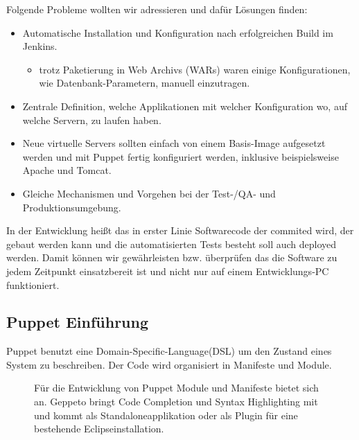 \documentclass[12pt,a4paper,ngerman]{article}
\begin{document}
Folgende Probleme wollten wir adressieren und dafür Lösungen finden:
\begin{itemize}
\item Automatische Installation und Konfiguration nach erfolgreichen Build im Jenkins.
\begin{itemize}
\item trotz Paketierung in Web Archivs (WARs) waren einige Konfigurationen, wie Datenbank-Parametern, manuell einzutragen.
\end{itemize}
\item Zentrale Definition, welche Applikationen mit welcher Konfiguration wo, auf welche Servern, zu laufen haben.
\item Neue virtuelle Servers sollten einfach von einem Basis-Image aufgesetzt werden und mit Puppet fertig konfiguriert werden, inklusive beispielsweise Apache und Tomcat.
\item Gleiche Mechanismen und Vorgehen bei der Test-/QA- und Produktionsumgebung.
\end{itemize}

In der Entwicklung heißt das in erster Linie Softwarecode der commited wird, der gebaut werden kann und die automatisierten Tests besteht soll auch deployed werden. Damit können wir gewährleisten bzw. überprüfen das die Software zu jedem Zeitpunkt einsatzbereit ist und nicht nur auf einem Entwicklungs-PC funktioniert.

\subsection{Puppet Einführung}

Puppet benutzt eine Domain-Specific-Language(DSL) um den Zustand eines System zu beschreiben. Der Code wird organisiert in Manifeste und Module.

\begin{figure}
\vspace{-20pt}
\begin{boxedminipage}{8cm}
Für die Entwicklung von Puppet Module und Manifeste bietet sich \cite{geppeto} an. Geppeto bringt Code Completion und Syntax Highlighting mit und kommt als Standaloneapplikation oder als Plugin für eine bestehende Eclipseinstallation. 
\end{boxedminipage}
\vspace{-20pt}
\end{figure}
\end{document}
